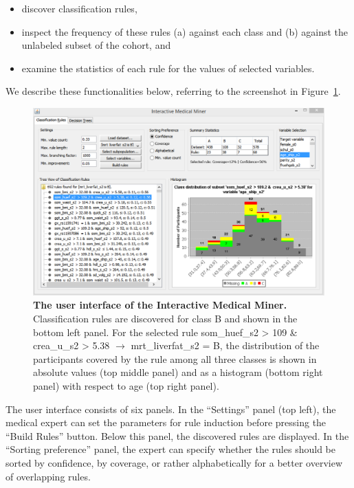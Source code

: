 \documentclass[
  oneside]{book}
\providecommand{\tightlist}{%
  \setlength{\itemsep}{0pt}\setlength{\parskip}{0pt}}
\begin{document}
\begin{itemize}
\tightlist
\item
  discover classification rules,
\item
  inspect the frequency of these rules (a) against each class and (b) against the unlabeled subset of the cohort, and
\item
  examine the statistics of each rule for the values of selected variables.
\end{itemize}

We describe these functionalities below, referring to the screenshot in Figure~\ref{fig:03-imm-modified}.



\begin{figure}[htb]

{\centering \includegraphics[width=1\linewidth]{figures/03-imm-modified} 

}

\caption{\textbf{The user interface of the Interactive Medical Miner.} Classification rules are discovered for class B and shown in the bottom left panel. For the selected rule som\_huef\_s2 \textgreater{} 109 \& crea\_u\_s2 \textgreater{} 5.38 \(\longrightarrow\) mrt\_liverfat\_s2 = B, the distribution of the participants covered by the rule among all three classes is shown in absolute values (top middle panel) and as a histogram (bottom right panel) with respect to age (top right panel).}\label{fig:03-imm-modified}
\end{figure}

The user interface consists of six panels.
In the ``Settings'' panel (top left), the medical expert can set the parameters for rule induction before pressing the ``Build Rules'' button.
Below this panel, the discovered rules are displayed.
In the ``Sorting preference'' panel, the expert can specify whether the rules should be sorted by confidence, by coverage, or rather alphabetically for a better overview of overlapping rules.
\end{document}
